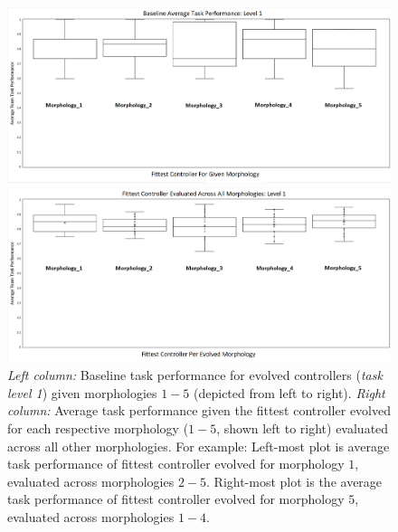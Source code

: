 \begin{figure}[t]
	\begin{minipage}{0.5\textwidth}
		\includegraphics[width=\textwidth]{Figures/Results/Baseline Calc Phase/Baseline_Level_1.png}
	\end{minipage}
	\begin{minipage}{0.5\textwidth}
		\includegraphics[width=\textwidth]{Figures/Results/Evaluation Phase/Average_Eval_Level_1.png}
	\end{minipage}
\caption{\textit{Left column:} Baseline task performance for evolved controllers (\textit{task level 1})
given morphologies $1-5$ (depicted from left to right).
\textit{Right column:} Average task performance given the fittest controller evolved
for each respective morphology ($1-5$, shown left to right) evaluated across all other morphologies.
For example: Left-most plot is average task performance of fittest controller evolved for
morphology $1$, evaluated across morphologies $2-5$.  Right-most plot is the average task performance
of fittest controller evolved for morphology $5$, evaluated across morphologies $1-4$.}\label{fig:level1results}
\end{figure}

